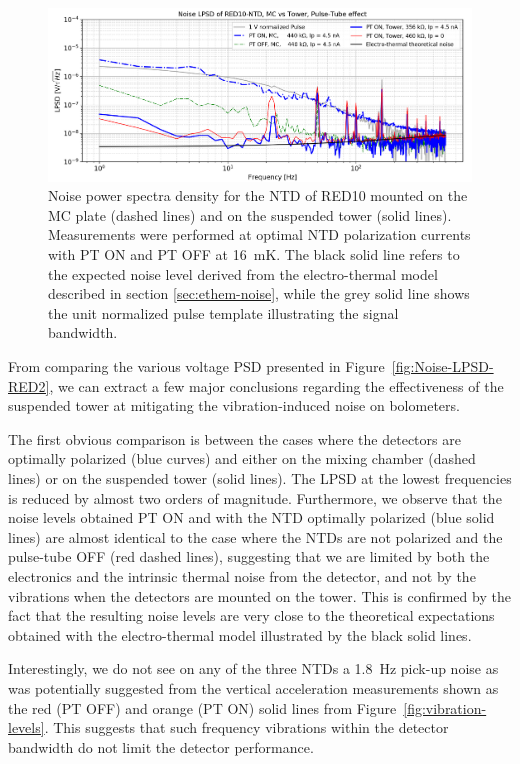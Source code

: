 \begin{figure}
\centering 
\includegraphics[width=\textwidth]{Figures/Experiment/red10_lspd_vibration.pdf}
\caption{Noise power spectra density for the NTD of RED10 mounted on the MC plate (dashed lines) and on the suspended tower (solid lines). Measurements were performed at optimal NTD polarization currents with PT ON and PT OFF at \SI{16}{\milli\kelvin}. The black solid line refers to the expected noise level derived from the electro-thermal model described in section \ref{sec:ethem-noise}, while the grey solid line shows the unit normalized pulse template illustrating the signal bandwidth.}
\label{fig:red10-vibration}
\end{figure}


From comparing the various voltage PSD presented in Figure~\ref{fig:Noise-LPSD-RED2}, we can extract a few major conclusions regarding the effectiveness of the suspended tower at mitigating the vibration-induced noise on bolometers. 

The first obvious comparison is between the cases where the detectors are optimally polarized (blue curves) and either on the mixing chamber (dashed lines) or on the suspended tower (solid lines). The LPSD at the lowest frequencies is reduced by almost two orders of magnitude. 
Furthermore, we observe that the noise levels obtained PT ON and with the NTD optimally polarized (blue solid lines) are almost identical to the case where the NTDs are not polarized and the pulse-tube OFF (red dashed lines), suggesting that we are limited by both the electronics and the intrinsic thermal noise from the detector, and not by the vibrations when the detectors are mounted on the tower.
 This is confirmed by the fact that the resulting noise levels are very close to the theoretical expectations obtained with the electro-thermal model illustrated by the black solid lines.

Interestingly, we do not see on any of the three NTDs a \SI{1.8}{\Hz} pick-up noise as was potentially suggested from the vertical acceleration measurements shown as the red (PT OFF) and orange (PT ON) solid lines from Figure~\ref{fig:vibration-levels}. This  suggests that such frequency vibrations within the detector bandwidth do not limit the detector performance.

